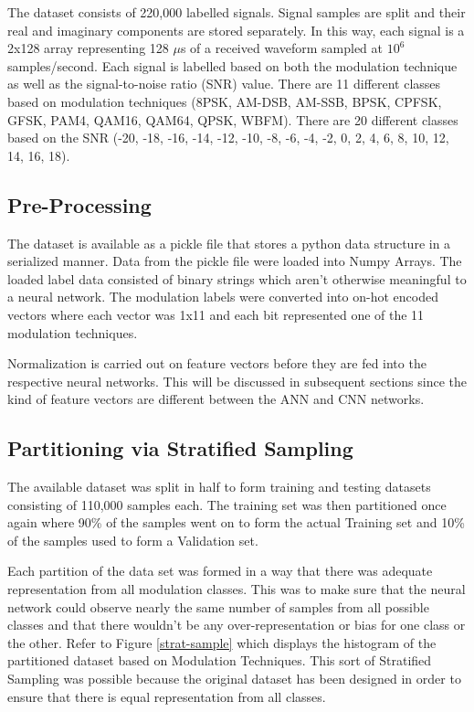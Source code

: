\documentclass[journal,onecolumn]{IEEEtran}
\begin{document}
The dataset consists of 220,000 labelled signals. Signal samples are split and their real and imaginary components are stored separately. In this way, each signal is a 2x128 array representing 128 $\mu$s of a received waveform sampled at $10^{6}$ samples/second. Each signal is labelled based on both the modulation technique as well as the signal-to-noise ratio (SNR) value. There are 11 different classes based on modulation techniques  (8PSK, AM-DSB, AM-SSB, BPSK, CPFSK, GFSK, PAM4, QAM16, QAM64, QPSK, WBFM). There are 20 different classes based on the SNR (-20, -18, -16, -14, -12, -10, -8, -6, -4, -2, 0, 2, 4, 6, 8, 10, 12, 14, 16, 18).

\subsection{Pre-Processing}

The dataset is available as a pickle file that stores a python data structure in a serialized manner. Data from the pickle file were loaded into Numpy Arrays. The loaded label data consisted of binary strings which aren't otherwise meaningful to a neural network. The modulation labels were converted into on-hot encoded vectors where each vector was 1x11 and each bit represented one of the 11 modulation techniques.

Normalization is carried out on feature vectors before they are fed into the respective neural networks. This will be discussed in subsequent sections since the kind of feature vectors are different between the ANN and CNN networks.

\subsection{Partitioning via Stratified Sampling}

The available dataset was split in half to form training and testing datasets consisting of 110,000 samples each. The training set was then partitioned once again where 90\% of the samples went on to form the actual Training set and 10\% of the samples used to form a Validation set.

Each partition of the data set was formed in a way that there was adequate representation from all modulation classes. This was to make sure that the neural network could observe nearly the same number of samples from all possible classes and that there wouldn't be any over-representation or bias for one class or the other. Refer to Figure \ref{strat-sample} which displays the histogram of the partitioned dataset based on Modulation Techniques. This sort of Stratified Sampling \cite{stratSamp} was possible because the original dataset has been designed in order to ensure that there is equal representation from all classes.
\end{document}
